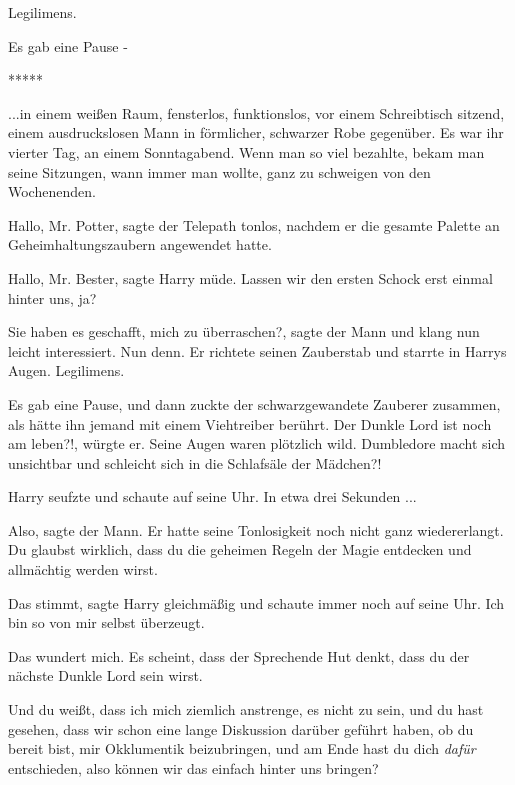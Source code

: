 \glqq{}Legilimens.\grqq{}

Es gab eine Pause -

\begin{center}*****\end{center}

...in einem weißen Raum, fensterlos, funktionslos, vor einem Schreibtisch
sitzend, einem ausdruckslosen Mann in förmlicher, schwarzer Robe gegenüber. Es
war ihr vierter Tag, an einem Sonntagabend. Wenn man so viel bezahlte, bekam man
seine Sitzungen, wann immer man wollte, ganz zu schweigen von den Wochenenden.

\glqq{}Hallo, Mr. Potter\grqq{}, sagte der Telepath tonlos, nachdem er die
gesamte Palette an Geheimhaltungszaubern angewendet hatte.

\glqq{}Hallo, Mr. Bester\grqq{}, sagte Harry müde. \glqq{}Lassen wir den ersten
Schock erst einmal hinter uns, ja?\grqq{}

\glqq{}Sie haben es geschafft, mich zu überraschen?\grqq{}, sagte der Mann und
klang nun leicht interessiert. \glqq{}Nun denn.\grqq{} Er richtete seinen
Zauberstab und starrte in Harrys Augen. \glqq{} Legilimens.\grqq{}

Es gab eine Pause, und dann zuckte der schwarzgewandete Zauberer zusammen, als
hätte ihn jemand mit einem Viehtreiber berührt. \glqq{}Der Dunkle Lord ist noch
am leben?!\grqq{}, würgte er. Seine Augen waren plötzlich wild.
\glqq{}Dumbledore macht sich unsichtbar und schleicht sich in die Schlafsäle der
Mädchen?!\grqq{}

Harry seufzte und schaute auf seine Uhr. In etwa drei Sekunden ...

\glqq{}Also\grqq{}, sagte der Mann. Er hatte seine Tonlosigkeit noch nicht ganz
wiedererlangt. \glqq{}Du glaubst wirklich, dass du die geheimen Regeln der Magie
entdecken und allmächtig werden wirst.\grqq{}

\glqq{}Das stimmt\grqq{}, sagte Harry gleichmäßig und schaute immer noch auf
seine Uhr. \glqq{}Ich bin so von mir selbst überzeugt.\grqq{}

\glqq{}Das wundert mich. Es scheint, dass der Sprechende Hut denkt, dass du der
nächste Dunkle Lord sein wirst.\grqq{}

\glqq{}Und du weißt, dass ich mich ziemlich anstrenge, es nicht zu sein, und du
hast gesehen, dass wir schon eine lange Diskussion darüber geführt haben, ob du
bereit bist, mir Okklumentik beizubringen, und am Ende hast du dich \emph{dafür}
entschieden, also können wir das einfach hinter uns bringen?\grqq{}

